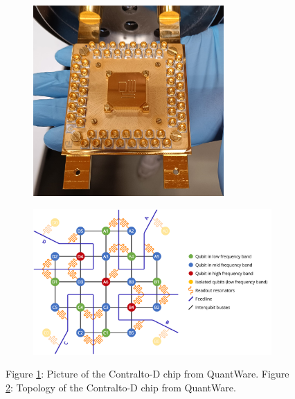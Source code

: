 \begin{figure}[ht!]
    \centering
    \begin{subfigure}{0.40\textwidth}
        \centering
        \includegraphics[width=0.80\textwidth]{figures/png/qw11q.jpeg}
        \subcaption{}
        \label{fig:qw11q_picture}
    \end{subfigure}
    \hfill
    \begin{subfigure}{0.50\textwidth}
        \centering
        \includegraphics[width=\textwidth]{figures/png/qw11q.png}
        \subcaption{}
        \label{fig:qw11q_topology}
    \end{subfigure}
    \caption{Figure \ref{fig:qw11q_picture}: Picture of the Contralto-D chip from QuantWare. Figure \ref{fig:qw11q_topology}: Topology of the Contralto-D chip from QuantWare.}
    \label{fig:qw11q}
\end{figure}

